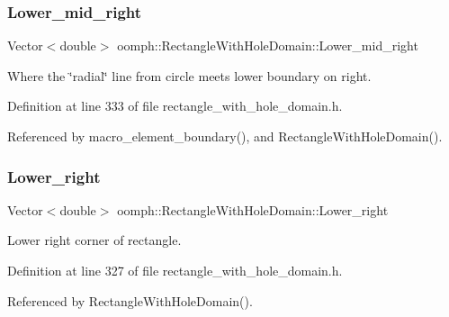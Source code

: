 \subsubsection{\texorpdfstring{Lower\+\_\+mid\+\_\+right}{Lower\_mid\_right}}
{\footnotesize\ttfamily Vector$<$double$>$ oomph\+::\+Rectangle\+With\+Hole\+Domain\+::\+Lower\+\_\+mid\+\_\+right\hspace{0.3cm}{\ttfamily [private]}}



Where the \char`\"{}radial\char`\"{} line from circle meets lower boundary on right. 



Definition at line 333 of file rectangle\+\_\+with\+\_\+hole\+\_\+domain.\+h.



Referenced by macro\+\_\+element\+\_\+boundary(), and Rectangle\+With\+Hole\+Domain().

\mbox{\label{classoomph_1_1RectangleWithHoleDomain_ab71febd980c61d0c2ba0a76eca053a97}} 
\subsubsection{\texorpdfstring{Lower\+\_\+right}{Lower\_right}}
{\footnotesize\ttfamily Vector$<$double$>$ oomph\+::\+Rectangle\+With\+Hole\+Domain\+::\+Lower\+\_\+right\hspace{0.3cm}{\ttfamily [private]}}



Lower right corner of rectangle. 



Definition at line 327 of file rectangle\+\_\+with\+\_\+hole\+\_\+domain.\+h.



Referenced by Rectangle\+With\+Hole\+Domain().

\mbox{\label{classoomph_1_1RectangleWithHoleDomain_a0e5a29a907836dace560edd72a70917d}} 
